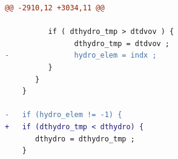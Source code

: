 \begin{lstlisting}[language=diff,basicstyle=\ttfamily\scriptsize,breaklines=true,caption={llnl_c1/lulesh — FASTER (e6c_bare)}]
@@ -2910,12 +3034,11 @@
 
          if ( dthydro_tmp > dtdvov ) {
                dthydro_tmp = dtdvov ;
-               hydro_elem = indx ;
          }
       }
    }
 
-   if (hydro_elem != -1) {
+   if (dthydro_tmp < dthydro) {
       dthydro = dthydro_tmp ;
    }
 
\end{lstlisting}
